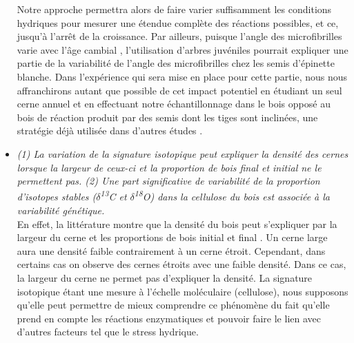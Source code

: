 \documentclass[a4paper,12pt]{report}
\newcommand{\Ctreize}{$\delta$\textsuperscript{13}C\xspace}
\newcommand{\Odixhuit}{$\delta$\textsuperscript{18}O\xspace}
\begin{document}
\begin{itemize}
	Notre approche permettra alors de faire varier suffisamment les conditions hydriques pour mesurer une étendue complète des réactions possibles, et ce, jusqu'à l'arrêt de la croissance. Par ailleurs, puisque l'angle des microfibrilles varie avec l'âge cambial \citep{Lindstrom1998}, l'utilisation d'arbres juvéniles pourrait expliquer une partie de la variabilité de l'angle des microfibrilles chez les semis d'épinette blanche. Dans l'expérience qui sera mise en place pour cette partie, nous nous affranchirons autant que possible de cet impact potentiel en étudiant un seul cerne annuel et en effectuant notre échantillonnage dans le bois opposé au bois de réaction produit par des semis dont les tiges sont inclinées, une stratégie déjà utilisée dans d'autres études \citep{Apiolaza2011}.\\  
	
	\item \emph{(1) La variation de la signature isotopique peut expliquer la densité des cernes lorsque la largeur de ceux-ci et la proportion de bois final et initial ne le permettent pas. (2) Une part significative de variabilité de la proportion d'isotopes stables (\Ctreize et \Odixhuit) dans la cellulose du bois est associée à la variabilité génétique.} \\ 
	
	En effet, la littérature montre que la densité du bois peut s'expliquer par la largeur du cerne et les proportions de bois initial et final \citep{Moore2011}. Un cerne large aura une densité faible contrairement à un cerne étroit. Cependant, dans certains cas on observe des cernes étroits avec une faible densité. Dans ce cas, la largeur du cerne ne permet pas d'expliquer la densité. La signature isotopique étant une mesure à l'échelle moléculaire (cellulose), nous supposons qu'elle peut permettre de mieux comprendre ce phénomène du fait qu'elle prend en compte les réactions enzymatiques et pouvoir faire le lien avec d'autres facteurs tel que le stress hydrique.\\
	

\end{itemize}
\end{document}
